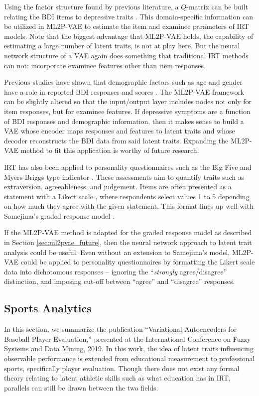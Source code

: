 Using the factor structure found by previous literature, a $Q$-matrix can be built relating the BDI items to depressive traits \cite{fragoso2013}. This domain-specific information can be utilized in ML2P-VAE to estimate the item and examinee parameters of IRT models. Note that the biggest advantage that ML2P-VAE holds, the capability of estimating a large number of latent traits, is not at play here. But the neural network structure of a VAE again does something that traditional IRT methods can not: incorporate examinee features other than item responses.

Previous studies have shown that demographic factors such as age and gender have a role in reported BDI responses and scores \cite{de2019}. The ML2P-VAE framework can be slightly altered so that the input/output layer includes nodes not only for item responses, but for examinee features. If depressive symptoms are a function of BDI responses and demographic information, then it makes sense to build a VAE whose encoder maps responses and features to latent traits and whose decoder reconstructs the BDI data from said latent traits. Expanding the ML2P-VAE method to fit this application is worthy of future research.

IRT has also been applied to personality questionnaires such as the Big Five and Myers-Briggs type indicator \cite{myers1962, robie2001}. These assessments aim to quantify traits such as extraversion, agreeableness, and judgement. Items are often presented as a statement with a Likert scale \cite{likert1932}, where respondents select values 1 to 5 depending on how much they agree with the given statement. This format lines up well with Samejima's graded response model \cite{samejima1997}. 

If the ML2P-VAE method is adapted for the graded response model as described in Section \ref{sec:ml2pvae_future}, then the neural network approach to latent trait analysis could be useful. Even without an extension to Samejima's model, ML2P-VAE could be applied to personality questionnaires by formatting the Likert scale data into dichotomous responses -- ignoring the ``\textit{strongly} agree/disagree'' distinction, and imposing  cut-off between ``agree'' and ``disagree'' responses.

\subsection{Sports Analytics}
In this section, we summarize the publication ``Variational Autoencoders for Baseball Player Evaluation,'' \cite{fsdm_paper} presented at the International Conference on Fuzzy Systems and Data Mining, 2019. In this work, the idea of latent traits influencing observable performance is extended from educational measurement to professional sports, specifically player evaluation. Though there does not exist any formal theory relating to latent athletic skills such as what education has in IRT, parallels can still be drawn between the two fields.

